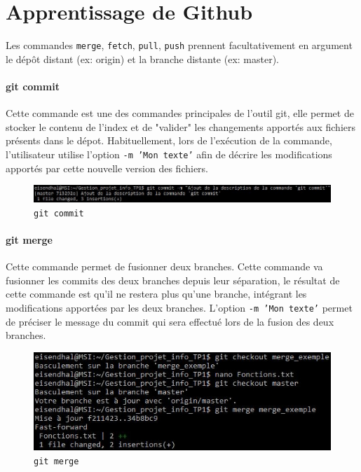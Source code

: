 \documentclass[11pt,canadien]{article}
\begin{document}
\section{Apprentissage de Github}
Les commandes \texttt{merge}, \texttt{fetch}, \texttt{pull}, \texttt{push} prennent facultativement en argument le dépôt distant (ex: origin) et la branche distante (ex: master).

\paragraph{git commit}Cette commande est une des commandes principales de l'outil git, elle permet de stocker le contenu de l'index et de "valider" les changements apportés aux fichiers présents dans le dépot. Habituellement, lors de l'exécution de la commande, l'utilisateur utilise l'option \texttt{-m 'Mon texte'} afin de décrire les modifications apportés par cette nouvelle version des fichiers.
\begin{figure}[h]
	\centering
	\includegraphics[width=\textwidth]{images/git_commit.jpg}
	\caption{\texttt{git commit}}
	\label{fig:git_commit}
\end{figure}

\paragraph{git merge}Cette commande permet de fusionner deux branches. Cette commande va fusionner les commits des deux branches depuis leur séparation, le résultat de cette commande est qu'il ne restera plus qu'une branche, intégrant les modifications apportées par les deux branches. L'option \texttt{-m 'Mon texte'} permet de préciser le message du commit qui sera effectué lors de la fusion des deux branches.
\begin{figure}[h]
	\centering
	\includegraphics[width=\textwidth]{images/git_merge.jpg}
	\caption{\texttt{git merge}}
	\label{fig:git_merge}
\end{figure}
\end{document}
